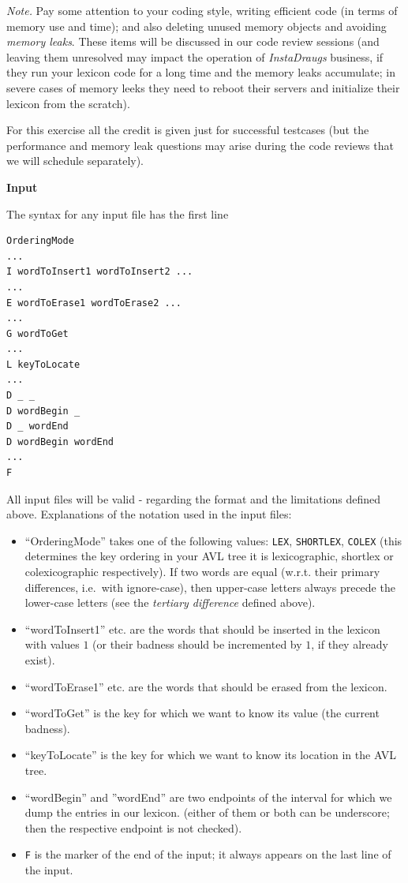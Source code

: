 \documentclass[11pt]{article}
\begin{document}
{\em Note.} Pay some attention to your coding style, writing efficient code (in terms of 
memory use and time); and also deleting unused memory objects and avoiding 
{\em memory leaks}. These items will be discussed in our code review sessions
(and leaving them unresolved may impact the operation of {\em InstaDraugs} business, 
if they run your lexicon code for a long time and the memory leaks accumulate; in 
severe cases of memory leeks 
they need to reboot their servers and initialize their lexicon from the scratch).

For this exercise all the credit is given just for successful testcases (but the performance and
memory leak questions may arise during the code reviews that we will schedule separately).




\vspace{20pt}
{\bf \large Input}


The syntax for any input file has the first line 

\begin{verbatim}
OrderingMode
...
I wordToInsert1 wordToInsert2 ...
...
E wordToErase1 wordToErase2 ...
...
G wordToGet
...
L keyToLocate
...
D _ _
D wordBegin _
D _ wordEnd
D wordBegin wordEnd
...
F
\end{verbatim}

All input files will be valid - regarding the format and the limitations defined above. 
Explanations of the notation used in the input files:
\begin{itemize}
\item ``OrderingMode'' takes one of the following values: {\tt LEX}, 
{\tt SHORTLEX}, {\tt COLEX} (this determines the key ordering in your AVL 
tree \textendash{} it is lexicographic, shortlex or colexicographic respectively). 
If two words are equal (w.r.t. their primary differences, i.e.\ with ignore-case), then upper-case letters 
always precede the lower-case letters (see the {\em tertiary difference} defined above). 
\item ``wordToInsert1'' etc. are the words that should be inserted in the lexicon with values $1$
(or their badness should be incremented by $1$, if they already exist). 
\item ``wordToErase1'' etc. are the words that should be erased from the lexicon. 
\item ``wordToGet'' is the key for which we want to know its value (the current badness).
\item ``keyToLocate'' is the key for which we want to know its location in the AVL tree.
\item ``wordBegin'' and ''wordEnd'' are two endpoints of the interval for which we dump the entries in our lexicon. 
(either of them or both can be underscore; then the respective endpoint is not checked). 
\item {\tt F} is the marker of the end of the input; it always appears on the last line of the input. 
\end{itemize}
\end{document}

